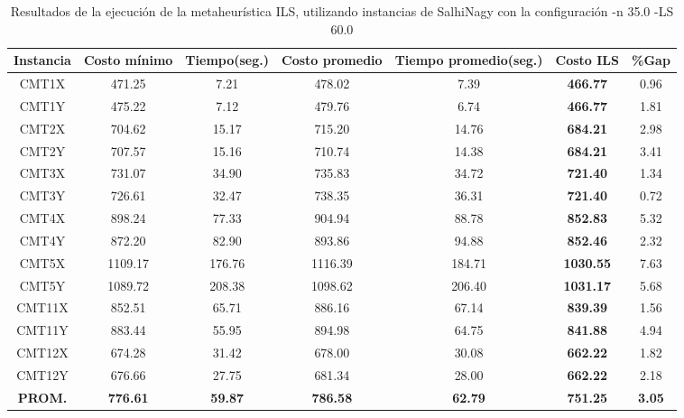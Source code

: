 \begin{table}[ht]
\caption{Resultados de la ejecución de la metaheurística ILS, utilizando instancias de SalhiNagy con la configuración -n 35.0 -LS 60.0}
\centering
\small
\begin{tabular}{c c c c c c c}
\hline\hline
Instancia & Costo mínimo & Tiempo(seg.) & Costo promedio & Tiempo promedio(seg.) & Costo ILS & \%Gap \\ [0.5ex]
\hline
CMT1X & 471.25 & 7.21 & 
478.02 & 7.39 & \bf{466.77} & 
0.96\\CMT1Y & 475.22 & 7.12 & 
479.76 & 6.74 & \bf{466.77} & 
1.81\\CMT2X & 704.62 & 15.17 & 
715.20 & 14.76 & \bf{684.21} & 
2.98\\CMT2Y & 707.57 & 15.16 & 
710.74 & 14.38 & \bf{684.21} & 
3.41\\CMT3X & 731.07 & 34.90 & 
735.83 & 34.72 & \bf{721.40} & 
1.34\\CMT3Y & 726.61 & 32.47 & 
738.35 & 36.31 & \bf{721.40} & 
0.72\\CMT4X & 898.24 & 77.33 & 
904.94 & 88.78 & \bf{852.83} & 
5.32\\CMT4Y & 872.20 & 82.90 & 
893.86 & 94.88 & \bf{852.46} & 
2.32\\CMT5X & 1109.17 & 176.76 & 
1116.39 & 184.71 & \bf{1030.55} & 
7.63\\CMT5Y & 1089.72 & 208.38 & 
1098.62 & 206.40 & \bf{1031.17} & 
5.68\\CMT11X & 852.51 & 65.71 & 
886.16 & 67.14 & \bf{839.39} & 
1.56\\CMT11Y & 883.44 & 55.95 & 
894.98 & 64.75 & \bf{841.88} & 
4.94\\CMT12X & 674.28 & 31.42 & 
678.00 & 30.08 & \bf{662.22} & 
1.82\\CMT12Y & 676.66 & 27.75 & 
681.34 & 28.00 & \bf{662.22} & 
2.18\\\bf{PROM.} & 
\bf{776.61} & \bf{59.87} & \bf{786.58} & \bf{62.79} & \bf{751.25} & \bf{3.05}\\[1ex]\hline
\end{tabular}
\label{table:nonlin}
\end{table} \clearpage
